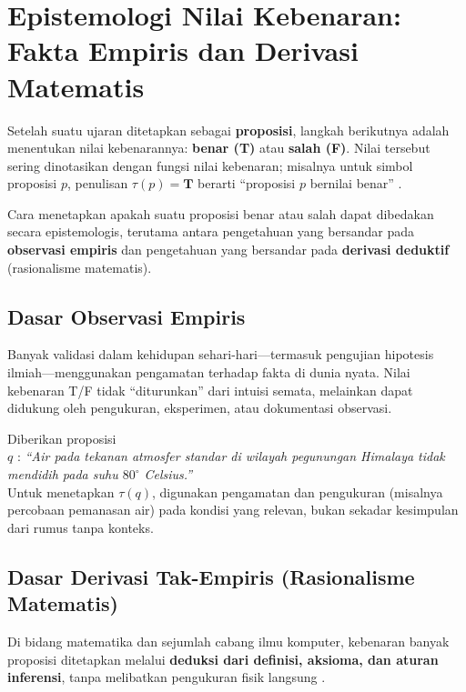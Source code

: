 \section{Epistemologi Nilai Kebenaran: Fakta Empiris dan Derivasi Matematis}

Setelah suatu ujaran ditetapkan sebagai \textbf{proposisi}, langkah berikutnya adalah menentukan nilai kebenarannya: \textbf{benar (T)} atau \textbf{salah (F)}. Nilai tersebut sering dinotasikan dengan fungsi nilai kebenaran; misalnya untuk simbol proposisi $p$, penulisan $\tau(p) = \mathbf{T}$ berarti ``proposisi $p$ bernilai benar'' \cite{rosen2019}.

Cara menetapkan apakah suatu proposisi benar atau salah dapat dibedakan secara epistemologis, terutama antara pengetahuan yang bersandar pada \textbf{observasi empiris} dan pengetahuan yang bersandar pada \textbf{derivasi deduktif} (rasionalisme matematis).

\subsection{Dasar Observasi Empiris}

Banyak validasi dalam kehidupan sehari-hari---termasuk pengujian hipotesis ilmiah---menggunakan pengamatan terhadap fakta di dunia nyata. Nilai kebenaran T/F tidak ``diturunkan'' dari intuisi semata, melainkan dapat didukung oleh pengukuran, eksperimen, atau dokumentasi observasi.

\begin{contoh}
Diberikan proposisi \\
\indent $q$ : \textit{``Air pada tekanan atmosfer standar di wilayah pegunungan Himalaya tidak mendidih pada suhu $80^\circ$ Celsius.''}\\
Untuk menetapkan $\tau(q)$, digunakan pengamatan dan pengukuran (misalnya percobaan pemanasan air) pada kondisi yang relevan, bukan sekadar kesimpulan dari rumus tanpa konteks.
\end{contoh}

\subsection{Dasar Derivasi Tak-Empiris (Rasionalisme Matematis)}

Di bidang matematika dan sejumlah cabang ilmu komputer, kebenaran banyak proposisi ditetapkan melalui \textbf{deduksi dari definisi, aksioma, dan aturan inferensi}, tanpa melibatkan pengukuran fisik langsung \cite{wiki_first_order_logic}.

